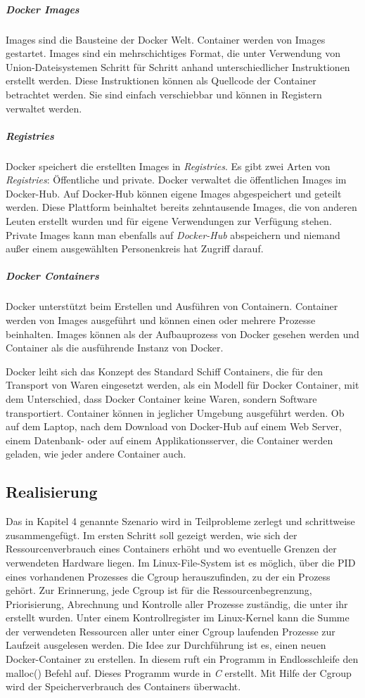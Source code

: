 \subparagraph{Docker Images}
Images sind die Bausteine der Docker Welt. Container werden von Images gestartet. Images sind ein mehrschichtiges Format, die unter Verwendung von Union-Dateisystemen Schritt für Schritt anhand unterschiedlicher Instruktionen erstellt werden. Diese Instruktionen können als Quellcode der Container betrachtet werden. Sie sind einfach verschiebbar und können in Registern verwaltet werden.

\subparagraph{Registries}
Docker speichert die erstellten Images in \emph{Registries}. Es gibt zwei Arten von \emph{Registries}: Öffentliche und private. Docker verwaltet die öffentlichen Images im Docker-Hub\cite{DockerInc.2016DockerHub}. Auf Docker-Hub können eigene Images abgespeichert und geteilt werden. Diese Plattform beinhaltet bereits zehntausende Images, die von anderen Leuten erstellt wurden und für eigene Verwendungen zur Verfügung stehen. Private Images kann man ebenfalls auf \emph{Docker-Hub} abspeichern und niemand außer einem ausgewählten Personenkreis hat Zugriff darauf.

\subparagraph{Docker Containers}
Docker unterstützt beim Erstellen und Ausführen von Containern. Container werden von Images ausgeführt und können einen oder mehrere Prozesse beinhalten. Images können als der Aufbauprozess von Docker gesehen werden und Container als die ausführende Instanz von Docker.

Docker leiht sich das Konzept des Standard Schiff Containers, die für den Transport von Waren eingesetzt werden, als ein Modell für Docker Container, mit dem Unterschied, dass Docker Container keine Waren, sondern Software transportiert. Container können in jeglicher Umgebung ausgeführt werden. Ob auf dem Laptop, nach dem Download von Docker-Hub auf einem Web Server, einem Datenbank- oder auf einem Applikationsserver, die Container werden geladen, wie jeder andere Container auch.

\pagebreak

\subsection{Realisierung}
Das in Kapitel 4 genannte Szenario wird in Teilprobleme zerlegt und schrittweise zusammengefügt. Im ersten Schritt soll gezeigt werden, wie sich der Ressourcenverbrauch eines Containers erhöht und wo eventuelle Grenzen der verwendeten Hardware liegen. Im Linux-File-System ist es möglich, über die PID eines vorhandenen Prozesses die Cgroup herauszufinden, zu der ein Prozess gehört. Zur Erinnerung, jede Cgroup ist für die Ressourcenbegrenzung, Priorisierung, Abrechnung und Kontrolle aller Prozesse zuständig, die unter ihr erstellt wurden. Unter einem Kontrollregister im Linux-Kernel kann die Summe der verwendeten Ressourcen aller unter einer Cgroup laufenden Prozesse zur Laufzeit ausgelesen werden. Die Idee zur Durchführung ist es, einen neuen Docker-Container zu erstellen. In diesem ruft ein Programm in Endlosschleife den malloc() Befehl auf. Dieses Programm wurde in \emph{C} erstellt. Mit Hilfe der Cgroup wird der Speicherverbrauch des Containers überwacht.

